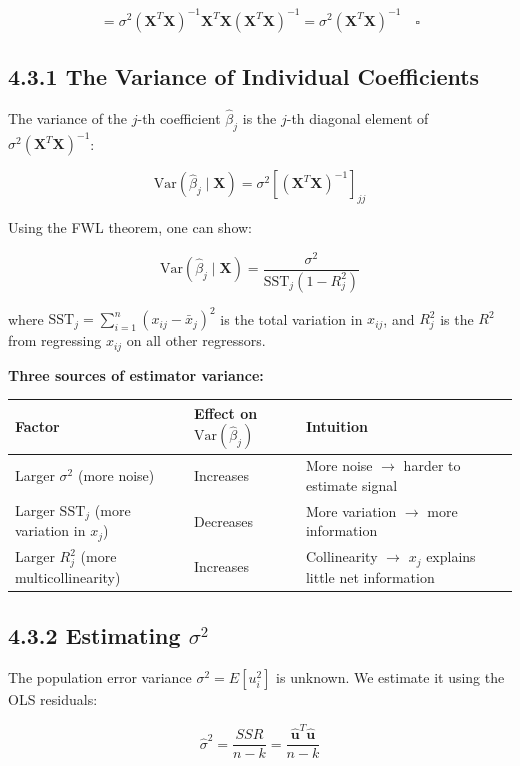 \[
= \sigma^2 (\mathbf{X}^T\mathbf{X})^{-1}\mathbf{X}^T\mathbf{X}(\mathbf{X}^T\mathbf{X})^{-1} = \sigma^2 (\mathbf{X}^T\mathbf{X})^{-1} \quad \square
\]

\subsection{4.3.1 The Variance of Individual Coefficients}

The variance of the $j$-th coefficient $\hat{\beta}_j$ is the $j$-th diagonal element of $\sigma^2(\mathbf{X}^T\mathbf{X})^{-1}$:

\[
\text{Var}(\hat{\beta}_j \mid \mathbf{X}) = \sigma^2 [(\mathbf{X}^T\mathbf{X})^{-1}]_{jj}
\]

Using the FWL theorem, one can show:

\[
\text{Var}(\hat{\beta}_j \mid \mathbf{X}) = \frac{\sigma^2}{\text{SST}_j (1 - R^2_j)}
\]

where $\text{SST}_j = \sum_{i=1}^n (x_{ij} - \bar{x}_j)^2$ is the total variation in $x_{ij}$, and $R^2_j$ is the $R^2$ from regressing $x_{ij}$ on all other regressors.

\textbf{Three sources of estimator variance:}

\begin{center}
\begin{tabular}{@{} l l l @{}}
\toprule
\textbf{Factor} & \textbf{Effect on $\text{Var}(\hat{\beta}_j)$} & \textbf{Intuition} \\
\midrule
Larger $\sigma^2$ (more noise) & Increases & More noise $\to$ harder to estimate signal \\
Larger $\text{SST}_j$ (more variation in $x_j$) & Decreases & More variation $\to$ more information \\
Larger $R^2_j$ (more multicollinearity) & Increases & Collinearity $\to$ $x_j$ explains little net information \\
\bottomrule
\end{tabular}
\end{center}

\subsection{4.3.2 Estimating $\sigma^2$}

The population error variance $\sigma^2 = E[u_i^2]$ is unknown. We estimate it using the OLS residuals:

\[
\hat{\sigma}^2 = \frac{SSR}{n - k} = \frac{\hat{\mathbf{u}}^T\hat{\mathbf{u}}}{n - k}
\]

